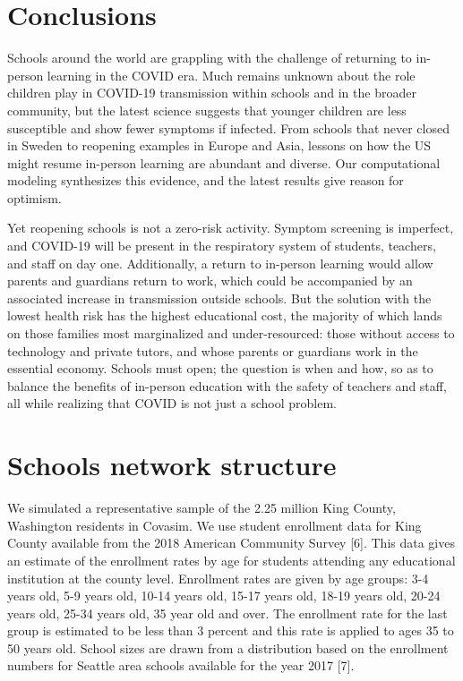 \documentclass[preprint,12pt]{elsarticle}
\begin{document}
\section{Conclusions}

Schools around the world are grappling with the challenge of returning to in-person learning in the COVID era. Much remains unknown about the role children play in COVID-19 transmission within schools and in the broader community, but the latest science suggests that younger children are less susceptible and show fewer symptoms if infected. From schools that never closed in Sweden to reopening examples in Europe and Asia, lessons on how the US might resume in-person learning are abundant and diverse. Our computational modeling synthesizes this evidence, and the latest results give reason for optimism.

Yet reopening schools is not a zero-risk activity. Symptom screening is imperfect, and COVID-19 will be present in the respiratory system of students, teachers, and staff on day one. Additionally, a return to in-person learning would allow parents and guardians return to work, which could be accompanied by an associated increase in transmission outside schools. But the solution with the lowest health risk has the highest educational cost, the majority of which lands on those families most marginalized and under-resourced: those without access to technology and private tutors, and whose parents or guardians work in the essential economy. Schools must open; the question is when and how, so as to balance the benefits of in-person education with the safety of teachers and staff, all while realizing that COVID is not just a school problem.


\printbibliography

\appendix

\section{Schools network structure}
\label{sec:AppendixA}

We simulated a representative sample of the 2.25 million King County, Washington residents in Covasim. We use student enrollment data for King County available from the 2018 American Community Survey [6]. This data gives an estimate of the enrollment rates by age for students attending any educational institution at the county level. Enrollment rates are given by age groups: 3-4 years old, 5-9 years old, 10-14 years old, 15-17 years old, 18-19 years old, 20-24 years old, 25-34 years old, 35 year old and over. The enrollment rate for the last group is estimated to be less than 3 percent   and this rate is applied to ages 35 to 50 years old. School sizes are drawn from a distribution based on the enrollment numbers for Seattle area schools available for the year 2017 [7].
\end{document}
